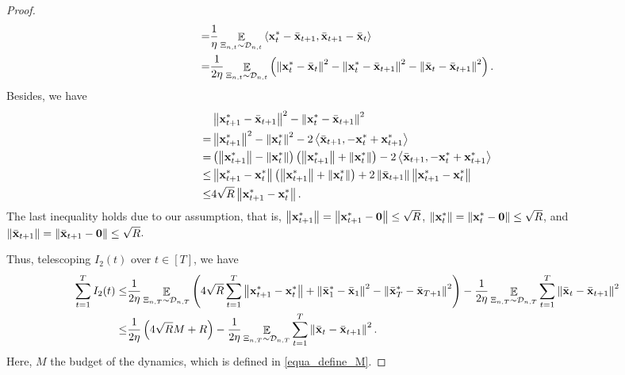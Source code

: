 \documentclass{article}
\begin{document}
\begin{proof}
\begin{align}
= & \frac{1}{\eta}\mathop{\mathbb{E}}_{ \Xi_{n,t} \sim \mathcal{D}_{n,t} }\left\langle {\bf x}_t^\ast - \bar{{\bf x}}_{t+1}, \bar{{\bf x}}_{t+1} - \bar{{\bf x}}_t  \right\rangle \\ \label{equa_I3_temp}
= & \frac{1}{2\eta}\mathop{\mathbb{E}}_{ \Xi_{n,t} \sim \mathcal{D}_{n,t} }\left(  \left\lVert{\bf x}_t^\ast - \bar{{\bf x}}_t\right\rVert^2 - \left\lVert{\bf x}_t^\ast - \bar{{\bf x}}_{t+1}\right\rVert^2 - \left\lVert\bar{{\bf x}}_t - \bar{{\bf x}}_{t+1}\right\rVert^2  \right). 
\end{align} Besides, we have
\begin{align}
\nonumber
& \left\lVert{\bf x}_{t+1}^\ast - \bar{{\bf x}}_{t+1}\right\rVert^2 - \left\lVert{\bf x}_t^\ast - \bar{{\bf x}}_{t+1}\right\rVert^2 \\ \nonumber 
= & \left\lVert{\bf x}_{t+1}^\ast\right\rVert^2 - \left\lVert{\bf x}_t^\ast\right\rVert^2 - 2\left\langle\bar{{\bf x}}_{t+1}, -{\bf x}_t^\ast + {\bf x}_{t+1}^\ast \right\rangle \\ \nonumber
= & \left( \left\lVert{\bf x}_{t+1}^\ast\right\rVert - \left\lVert{\bf x}_t^\ast\right\rVert \right) \left( \left\lVert{\bf x}_{t+1}^\ast\right\rVert + \left\lVert{\bf x}_t^\ast\right\rVert \right) - 2\left\langle\bar{{\bf x}}_{t+1}, -{\bf x}_t^\ast + {\bf x}_{t+1}^\ast \right\rangle \\ \nonumber
\le & \left\lVert{\bf x}_{t+1}^\ast - {\bf x}_t^\ast\right\rVert \left( \left\lVert{\bf x}_{t+1}^\ast\right\rVert + \left\lVert{\bf x}_t^\ast\right\rVert \right) + 2\left\lVert\bar{{\bf x}}_{t+1}\right\rVert \left\lVert{\bf x}_{t+1}^\ast-{\bf x}_t^\ast\right\rVert \\ \nonumber
\le & 4\sqrt{R}\left\lVert{\bf x}_{t+1}^\ast - {\bf x}_t^\ast\right\rVert.   
\end{align} The last inequality holds due to our assumption, that is, $\left\lVert{\bf x}_{t+1}^\ast\right\rVert=\left\lVert{\bf x}_{t+1}^\ast - {\bf 0}\right\rVert\le \sqrt{R}$, $\left\lVert{\bf x}_t^\ast\right\rVert = \left\lVert{\bf x}_t^\ast-{\bf 0}\right\rVert \le \sqrt{R}$, and $\left\lVert\bar{{\bf x}}_{t+1}\right\rVert = \left\lVert\bar{{\bf x}}_{t+1}-{\bf 0}\right\rVert \le \sqrt{R}$. 

Thus, telescoping $I_2(t)$ over $t\in[T]$, we have 
\begin{align}
\nonumber
\sum_{t=1}^T I_2(t) \le & \frac{1}{2\eta}\mathop{\mathbb{E}}_{ \Xi_{n,T} \sim \mathcal{D}_{n,T} }\left(  4\sqrt{R}\sum_{t=1}^T\left\lVert{\bf x}_{t+1}^\ast - {\bf x}_t^\ast\right\rVert + \left\lVert\bar{{\bf x}}_1^\ast - \bar{{\bf x}}_1\right\rVert^2 - \left\lVert\bar{{\bf x}}_T^\ast - \bar{{\bf x}}_{T+1}\right\rVert^2  \right) - \frac{1}{2\eta} \mathop{\mathbb{E}}_{ \Xi_{n,T} \sim \mathcal{D}_{n,T} }\sum_{t=1}^T \left\lVert\bar{{\bf x}}_t - \bar{{\bf x}}_{t+1}\right\rVert^2 \\ \nonumber
\le & \frac{1}{2\eta}\left(  4\sqrt{R} M + R  \right) - \frac{1}{2\eta} \mathop{\mathbb{E}}_{ \Xi_{n,T} \sim \mathcal{D}_{n,T} } \sum_{t=1}^T \left\lVert\bar{{\bf x}}_t - \bar{{\bf x}}_{t+1} \right\rVert^2.
\end{align} Here, $M$ the budget of the dynamics, which is defined in \eqref{equa_define_M}.


\end{proof}
\end{document}
